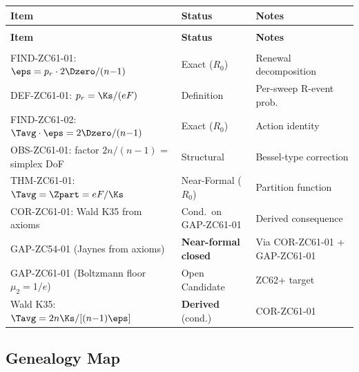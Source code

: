 \documentclass[12pt, a4paper]{article}
\begin{document}
{\small
\setlength{\LTpre}{4pt}\setlength{\LTpost}{4pt}
\renewcommand{\arraystretch}{1.30}
\begin{longtable}{>{\raggedright\arraybackslash}p{7.0cm}
                  >{\centering\arraybackslash}p{2.6cm}
                  >{\raggedright\arraybackslash}p{3.0cm}}
\toprule
\textbf{Item} & \textbf{Status} & \textbf{Notes} \\
\midrule
\endfirsthead
\multicolumn{3}{l}{\small\textit{(continued)}}\\[4pt]
\toprule
\textbf{Item} & \textbf{Status} & \textbf{Notes} \\
\midrule
\endhead
\midrule
\multicolumn{3}{r}{\small\textit{(continues)}}\\
\endfoot
\bottomrule
\endlastfoot
FIND-ZC61-01: $\eps = p_r \cdot 2\Dzero/(n{-}1)$
  & Exact ($R_0$) & Renewal decomposition \\
DEF-ZC61-01: $p_r = \Ks/(eF)$
  & Definition & Per-sweep R-event prob. \\
FIND-ZC61-02: $\Tavg\cdot\eps = 2\Dzero/(n{-}1)$
  & Exact ($R_0$) & Action identity \\
OBS-ZC61-01: factor $2n/(n{-}1)$ = simplex DoF
  & Structural & Bessel-type correction \\
THM-ZC61-01: $\Tavg = \Zpart = eF/\Ks$
  & Near-Formal ($R_0$) & Partition function \\
COR-ZC61-01: Wald K35 from axioms
  & Cond.\ on GAP-ZC61-01 & Derived consequence \\
\midrule
GAP-ZC54-01 (Jaynes from axioms)
  & \textbf{Near-formal closed} & Via COR-ZC61-01 + GAP-ZC61-01 \\
GAP-ZC61-01 (Boltzmann floor $\mu_2 = 1/e$)
  & Open Candidate & ZC62+ target \\
Wald K35: $\Tavg = 2n\Ks/[(n{-}1)\eps]$
  & \textbf{Derived} (cond.) & COR-ZC61-01 \\
\bottomrule
\end{longtable}
}

\subsection{Genealogy Map}
\label{sec:genealogy}
\end{document}
